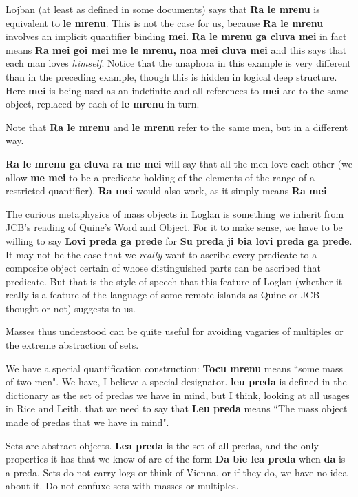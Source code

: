 \documentclass[12pt]{book}
\begin{document}
Lojban (at least as defined in some documents) says that {\bf Ra le mrenu} is equivalent to {\bf le mrenu}.  This is not the case for us, because {\bf Ra le mrenu} involves an implicit quantifier binding {\bf mei}.
{\bf Ra le mrenu ga cluva mei} in fact means {\bf Ra mei goi mei me le mrenu, noa mei cluva mei} and this says that each man loves {\em himself\/}.  Notice that the anaphora in this
example is very different than in the preceding example, though this is hidden in logical deep structure.  Here {\bf mei} is being used as an indefinite and all references to {\bf mei} are to the same object, replaced by each of {\bf le mrenu} in turn.

Note that {\bf Ra le mrenu} and {\bf le mrenu} refer to the same men, but in a different way.

{\bf Ra le mrenu ga cluva ra me mei} will say that all the men love each other (we allow {\bf me mei} to be a predicate holding of the elements of the range of a restricted quantifier).  {\bf Ra mei} would also work, as it simply means {\bf Ra mei}

The curious metaphysics of mass objects in Loglan is something we inherit from JCB's reading of Quine's Word and Object.  For it to make sense, we have to be willing to say {\bf Lovi preda ga prede} for
{\bf Su preda ji bia lovi preda ga prede}.  It may not be the case that we {\em really\/} want to ascribe every predicate to a composite object certain of whose distinguished parts can be ascribed that predicate.  But that is the style of speech that
this feature of Loglan (whether it really is a feature of the language of some remote islands as Quine or JCB thought or not) suggests to us.

Masses thus understood can be quite useful for avoiding vagaries of multiples or the extreme abstraction of sets.

We have a special quantification construction:  {\bf Tocu mrenu} means ``some mass of two men".  We have, I believe a special designator.  {\bf leu preda} is defined in the dictionary as the set of predas we have in
mind, but I think, looking at all usages in Rice and Leith, that we need to say that {\bf Leu preda} means ``The mass object made of predas that we have in mind".

Sets are abstract objects.  {\bf Lea preda} is the set of all predas, and the only properties it has that we know of are of the form {\bf Da bie lea preda} when {\bf da} is a preda.  Sets do not carry logs or think of Vienna, or if they
do, we have no idea about it.  Do not confuxe sets with masses or multiples.
\end{document}
